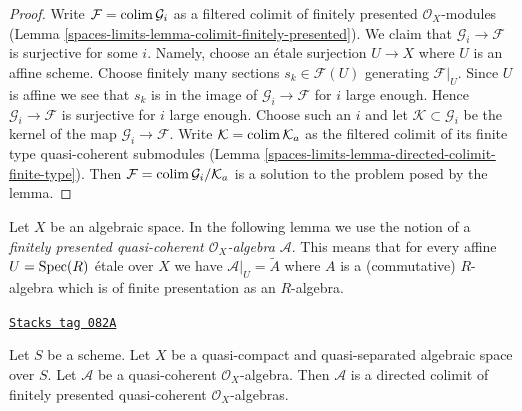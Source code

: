 \begin{proof}
Write $\mathcal{F} = \operatorname{colim} \mathcal{G}_i$ as a filtered colimit of
finitely presented $\mathcal{O}_X$-modules
(Lemma \ref{spaces-limits-lemma-colimit-finitely-presented}).
We claim that $\mathcal{G}_i \to \mathcal{F}$ is surjective for some $i$.
Namely, choose an \'etale surjection $U \to X$ where $U$ is an affine scheme.
Choose finitely many sections $s_k \in \mathcal{F}(U)$ generating
$\mathcal{F}|_U$. Since $U$ is affine we see that $s_k$ is in the image
of $\mathcal{G}_i \to \mathcal{F}$ for $i$ large enough. Hence
$\mathcal{G}_i \to \mathcal{F}$ is surjective for $i$ large enough.
Choose such an $i$ and let $\mathcal{K} \subset \mathcal{G}_i$ be the
kernel of the map $\mathcal{G}_i \to \mathcal{F}$. Write
$\mathcal{K} = \operatorname{colim} \mathcal{K}_a$
as the filtered colimit of its finite type quasi-coherent submodules
(Lemma \ref{spaces-limits-lemma-directed-colimit-finite-type}). Then
$\mathcal{F} = \operatorname{colim} \mathcal{G}_i/\mathcal{K}_a$ is a solution
to the problem posed by the lemma.
\end{proof}

Let $X$ be an algebraic space. In the following lemma we use the notion
of a {\it finitely presented quasi-coherent $\mathcal{O}_X$-algebra
$\mathcal{A}$}. This means that for every affine
$U = \operatorname{Spec}(R)$ \'etale over $X$ we have $\mathcal{A}|_U = \widetilde{A}$
where $A$ is a (commutative) $R$-algebra which is of finite presentation
as an $R$-algebra.

\begin{lemma}
\label{spaces-limits-lemma-algebra-directed-colimit-finite-presentation}
\href{https://stacks.math.columbia.edu/tag/082A}{\texttt{Stacks tag 082A}}

Let $S$ be a scheme. Let $X$ be a quasi-compact and quasi-separated
algebraic space over $S$.
Let $\mathcal{A}$ be a quasi-coherent $\mathcal{O}_X$-algebra.
Then $\mathcal{A}$ is a directed colimit of finitely presented
quasi-coherent $\mathcal{O}_X$-algebras.
\end{lemma}

